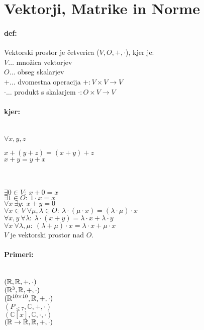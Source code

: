 \section{Vektorji, Matrike in Norme} 

\paragraph{def:} Vektorski prostor je četverica ($V, O, +, \cdot$), kjer je:\\
\indent $V \dots$ množica vektorjev\\
\indent $O \dots$ obseg skalarjev\\
\indent $+ \dots$ dvomestna operacija $+: V \times V \rightarrow V$\\
\indent $\cdot \dots$ produkt s skalarjem $\cdot: O \times V \rightarrow V$\\

\paragraph{kjer:}\ \\
\indent $\forall x, y, z$\indent 
\begin{minipage}{0.5\textwidth}
	$x + (y + z) = (x + y) + z$\\
	$x + y = y + x$
\end{minipage}\\\\
\indent $\exists 0 \in V:\ x+0 = x$\\
\indent $\exists 1 \in O:\ 1\cdot x = x$\\
\indent $\forall x\ \exists y:\ x + y = 0$\\
\indent $\forall x \in V\ \forall \mu, \lambda \in O:\ \lambda \cdot (\mu \cdot x) = (\lambda \cdot \mu) \cdot x$\\
\indent $\forall x,y\ \forall \lambda :\ \lambda \cdot (x + y) = \lambda \cdot x + \lambda \cdot y$\\
\indent $\forall x\ \forall \lambda, \mu :\ (\lambda + \mu) \cdot x = \lambda \cdot x + \mu \cdot x$\\

\noindent $V$ je vektorski prostor nad $O$.
\paragraph{Primeri:}\ \\
\indent $(\mathbb{R}, \mathbb{R}, +, \cdot)$\\
\indent $(\mathbb{R}^3, \mathbb{R}, +, \cdot)$\\
\indent $(\mathbb{R}^{10\times 10}, \mathbb{R}, +, \cdot)$\\
\indent $(P_{\leq 7}, \mathbb{C}, +, \cdot)$\\
\indent $(\mathbb{C}[x], \mathbb{C}, \cdot, \cdot)$\\
\indent $(\mathbb{R} \rightarrow \mathbb{R}, \mathbb{R}, +, \cdot)$